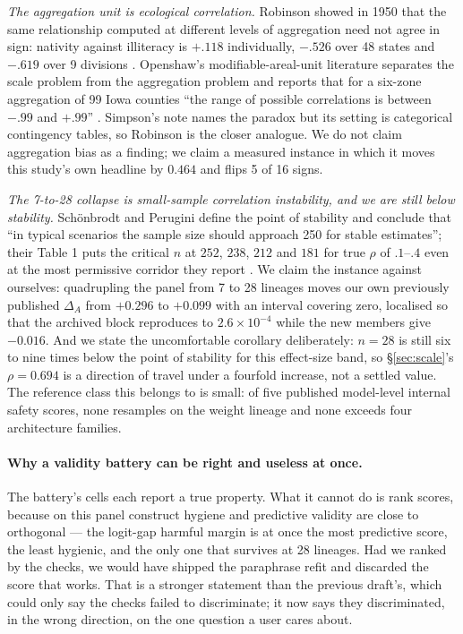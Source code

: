 \documentclass[11pt,letterpaper]{article}
\begin{document}
\emph{The aggregation unit is ecological correlation.} Robinson showed in 1950 that the same relationship computed at different levels of aggregation need not agree in sign: nativity against illiteracy is $+.118$ individually, $-.526$ over 48 states and $-.619$ over 9 divisions \citep{Robinson1950}. Openshaw's modifiable-areal-unit literature separates the scale problem from the aggregation problem and reports that for a six-zone aggregation of 99 Iowa counties ``the range of possible correlations is between $-.99$ and $+.99$'' \citep{Openshaw1984}. Simpson's note \citep{Simpson1951} names the paradox but its setting is categorical contingency tables, so Robinson is the closer analogue. We do not claim aggregation bias as a finding; we claim a measured instance in which it moves this study's own headline by $0.464$ and flips 5 of 16 signs.

\emph{The 7-to-28 collapse is small-sample correlation instability, and we are still below stability.} Sch\"onbrodt and Perugini define the point of stability and conclude that ``in typical scenarios the sample size should approach 250 for stable estimates''; their Table 1 puts the critical $n$ at $252$, $238$, $212$ and $181$ for true $\rho$ of $.1$--$.4$ even at the most permissive corridor they report \citep{Schonbrodt2013,Schonbrodt2018}. We claim the instance against ourselves: quadrupling the panel from 7 to 28 lineages moves our own previously published $\Delta_A$ from $+0.296$ to $+0.099$ with an interval covering zero, localised so that the archived block reproduces to $2.6\times10^{-4}$ while the new members give $-0.016$. And we state the uncomfortable corollary deliberately: $n = 28$ is still six to nine times below the point of stability for this effect-size band, so \S\ref{sec:scale}'s $\rho = 0.694$ is a direction of travel under a fourfold increase, not a settled value. The reference class this belongs to is small: of five published model-level internal safety scores, none resamples on the weight lineage and none exceeds four architecture families.

\paragraph{Why a validity battery can be right and useless at once.} The battery's cells each report a true property. What it cannot do is rank scores, because on this panel construct hygiene and predictive validity are close to orthogonal --- the logit-gap harmful margin is at once the most predictive score, the least hygienic, and the only one that survives at 28 lineages. Had we ranked by the checks, we would have shipped the paraphrase refit and discarded the score that works. That is a stronger statement than the previous draft's, which could only say the checks failed to discriminate; it now says they discriminated, in the wrong direction, on the one question a user cares about.
\end{document}
